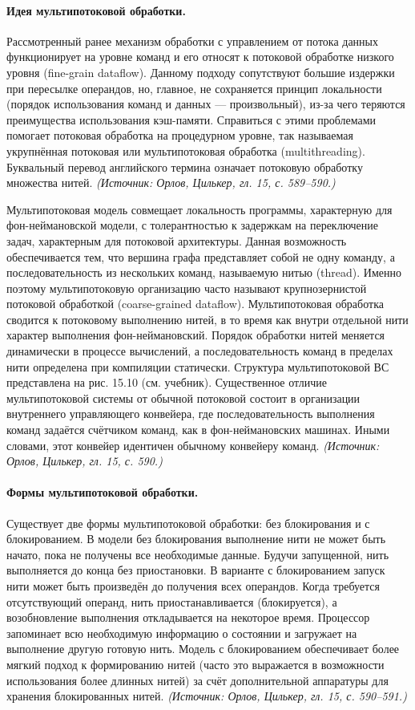 \documentclass[a4paper,12pt]{article}
\begin{document}
\paragraph{Идея мультипотоковой обработки.}
Рассмотренный ранее механизм обработки с управлением от потока данных функционирует на уровне команд и его относят к потоковой обработке низкого уровня (fine-grain dataflow). Данному подходу сопутствуют большие издержки при пересылке операндов, но, главное, не сохраняется принцип локальности (порядок использования команд и данных — произвольный), из-за чего теряются преимущества использования кэш-памяти. Справиться с этими проблемами помогает потоковая обработка на процедурном уровне, так называемая укрупнённая потоковая или мультипотоковая обработка (multithreading). Буквальный перевод английского термина означает потоковую обработку множества нитей.
\textit{(Источник: Орлов, Цилькер, гл. 15, с. 589--590.)}

Мультипотоковая модель совмещает локальность программы, характерную для фон-неймановской модели, с толерантностью к задержкам на переключение задач, характерным для потоковой архитектуры. Данная возможность обеспечивается тем, что вершина графа представляет собой не одну команду, а последовательность из нескольких команд, называемую нитью (thread). Именно поэтому мультипотоковую организацию часто называют крупнозернистой потоковой обработкой (coarse-grained dataflow). Мультипотоковая обработка сводится к потоковому выполнению нитей, в то время как внутри отдельной нити характер выполнения фон-неймановский. Порядок обработки нитей меняется динамически в процессе вычислений, а последовательность команд в пределах нити определена при компиляции статически. Структура мультипотоковой ВС представлена на рис. 15.10 (см. учебник). Существенное отличие мультипотоковой системы от обычной потоковой состоит в организации внутреннего управляющего конвейера, где последовательность выполнения команд задаётся счётчиком команд, как в фон-неймановских машинах. Иными словами, этот конвейер идентичен обычному конвейеру команд.
\textit{(Источник: Орлов, Цилькер, гл. 15, с. 590.)}

\paragraph{Формы мультипотоковой обработки.}
Существует две формы мультипотоковой обработки: без блокирования и с блокированием. В модели без блокирования выполнение нити не может быть начато, пока не получены все необходимые данные. Будучи запущенной, нить выполняется до конца без приостановки. В варианте с блокированием запуск нити может быть произведён до получения всех операндов. Когда требуется отсутствующий операнд, нить приостанавливается (блокируется), а возобновление выполнения откладывается на некоторое время. Процессор запоминает всю необходимую информацию о состоянии и загружает на выполнение другую готовую нить. Модель с блокированием обеспечивает более мягкий подход к формированию нитей (часто это выражается в возможности использования более длинных нитей) за счёт дополнительной аппаратуры для хранения блокированных нитей.
\textit{(Источник: Орлов, Цилькер, гл. 15, с. 590--591.)}
\end{document}
